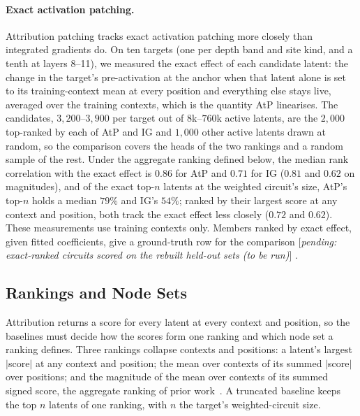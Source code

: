 \documentclass[10pt]{article}
\newif\ifexternal
\DeclareRobustCommand{\pending}[1]{%
  \ifexternal
    \ifvmode\textcolor{black!55}{[to be added]}\else\unskip\fi
  \else
    \textcolor{red!70!black}{[\textit{pending: #1}]}%
  \fi}
\begin{document}
\paragraph{Exact activation patching.}
Attribution patching tracks exact activation patching more closely than integrated gradients do.
On ten targets (one per depth band and site kind, and a tenth at layers 8--11), we measured the exact effect of each candidate latent: the change in the target's pre-activation at the anchor when that latent alone is set to its training-context mean at every position and everything else stays live, averaged over the training contexts, which is the quantity AtP linearises.
The candidates, $3{,}200$--$3{,}900$ per target out of $8$k--$760$k active latents, are the $2{,}000$ top-ranked by each of AtP and IG and $1{,}000$ other active latents drawn at random, so the comparison covers the heads of the two rankings and a random sample of the rest.
Under the aggregate ranking defined below, the median rank correlation with the exact effect is $0.86$ for AtP and $0.71$ for IG ($0.81$ and $0.62$ on magnitudes), and of the exact top-$n$ latents at the weighted circuit's size, AtP's top-$n$ holds a median $79\%$ and IG's $54\%$; ranked by their largest score at any context and position, both track the exact effect less closely ($0.72$ and $0.62$).
These measurements use training contexts only.
Members ranked by exact effect, given fitted coefficients, give a ground-truth row for the comparison \pending{exact-ranked circuits scored on the rebuilt held-out sets (to be run)}.

\subsection{Rankings and Node Sets}
\label{sec:membership}

Attribution returns a score for every latent at every context and position, so the baselines must decide how the scores form one ranking and which node set a ranking defines.
Three rankings collapse contexts and positions: a latent's largest $|$score$|$ at any context and position; the mean over contexts of its summed $|$score$|$ over positions; and the magnitude of the mean over contexts of its summed signed score, the aggregate ranking of prior work~\citep{marks2025sparse}.
A truncated baseline keeps the top $n$ latents of one ranking, with $n$ the target's weighted-circuit size.
\end{document}
